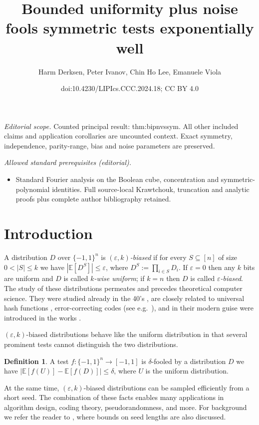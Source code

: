 \documentclass[10pt,a4paper]{article}
\title{Bounded uniformity plus noise fools symmetric tests exponentially well}
\author{Harm Derksen, Peter Ivanov, Chin Ho Lee, Emanuele Viola}
\date{doi:10.4230/LIPIcs.CCC.2024.18; CC BY 4.0}
\theoremstyle{definition}
\newtheorem{definition}[theorem]{Definition}
\newcommand{\eps}{\epsilon}
\newcommand{\pmo}{\{-1,1\}}
\def\epsilon{\varepsilon}
\begin{document}
\maketitle
\noindent\textit{Editorial scope.} Counted principal result: thm:bipnvssym. All other included claims and application corollaries are uncounted context. Exact symmetry, independence, parity-range, bias and noise parameters are preserved.\par\medskip
\noindent\textit{Allowed standard prerequisites (editorial).}\begin{itemize}
\item Standard Fourier analysis on the Boolean cube, concentration and symmetric-polynomial identities. Full source-local Krawtchouk, truncation and analytic proofs plus complete author bibliography retained.
\end{itemize}\medskip
\section{Introduction}
A distribution $D$ over $\{-1,1\}^n$ is \emph{$(\eps,k)$-biased} if for every $S \subseteq [n]$ of size $0 < |S| \le k$ we have $|\mathbb{E}[D^S]| \le \eps$, where $D^S := \prod_{i\in S} D_i$.  If $\eps = 0$ then any $k$ bits are uniform and $D$ is called \emph{$k$-wise uniform}; if $k = n$ then $D$ is called \emph{$\eps$-biased}.  The study of these distributions permeates and precedes theoretical computer science.  They were studied already in the 40's \cite{MR22821}, are closely related to universal hash functions \cite{CaW79}, error-correcting codes (see e.g.~\cite{DBLP:journals/eccc/HatamiH23}), and in their modern guise were introduced in the works \cite{ABI86,ChorGoHaFrRuSm85,NaN90}.

$(\eps,k)$-biased distributions behave like the uniform distribution in that several prominent tests cannot distinguish the two distributions.


\begin{definition} A test $f\colon \pmo^n \to [-1,1]$ is $\delta$-fooled by a distribution $D$ we have $|\mathbb{E}[f(U)] - \mathbb{E}[f(D)]|\le \delta$, where $U$ is the uniform distribution.
\end{definition}

At the same time, $(\eps,k)$-biased distributions can be sampled efficiently from a short seed. The combination of these facts enables many applications in algorithm design, coding theory, pseudorandomness, and more. For background we refer the reader to \cite{Vadhan12,DBLP:journals/eccc/HatamiH23,moti}, where bounds on seed lengths are also discussed.
\end{document}
